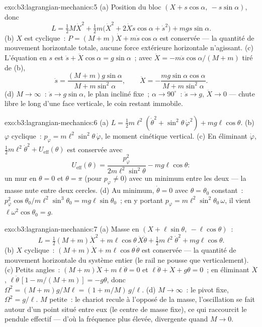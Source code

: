 \begin{solution}{exo:b3:lagrangian-mechanics:5}
(a) Position du bloc $(X + s\cos\alpha,\ -s\sin\alpha)$, donc
\[
L = \tfrac12 M\dot X^2 + \tfrac12 m\big(\dot X^2 +
2\dot X\dot s\cos\alpha + \dot s^2\big) + mgs\sin\alpha .
\]
(b) $X$ est cyclique~: $P = (M + m)\dot X + m\dot s\cos\alpha$ est
conservée --- la quantité de mouvement horizontale totale, aucune force
extérieure horizontale n'agissant. (c) L'équation en $s$ est $\ddot s + \ddot
X\cos\alpha = g\sin\alpha$~; avec $\ddot X = -m\ddot s\cos\alpha/(M +
m)$ tiré de (b),
\[
\ddot s = \frac{(M + m)g\sin\alpha}{M + m\sin^2\alpha} , \qquad
\ddot X = -\frac{mg\sin\alpha\cos\alpha}{M + m\sin^2\alpha} .
\]
(d) $M \to \infty$~: $\ddot s \to g\sin\alpha$, le plan incliné fixe~;
$\alpha \to 90^\circ$~: $\ddot s \to g$, $\ddot X \to 0$ --- chute libre
le long d'une face verticale, le coin restant immobile.
\end{solution}

\begin{solution}{exo:b3:lagrangian-mechanics:6}
(a) $L = \tfrac12 m\ell^2(\dot\theta^2 + \sin^2\theta\,\dot\varphi^2) +
mg\ell\cos\theta$. (b) $\varphi$ cyclique~: $p_\varphi =
m\ell^2\sin^2\theta\,\dot\varphi$, le moment cinétique vertical. (c)
En éliminant $\dot\varphi$, $\tfrac12 m\ell^2\dot\theta^2 +
U_{\text{eff}}(\theta)$ est conservée avec
\[
U_{\text{eff}}(\theta) = \frac{p_\varphi^2}{2m\ell^2\sin^2\theta}
 - mg\ell\cos\theta :
\]
un mur en $\theta = 0$ et $\theta = \pi$ (pour $p_\varphi \neq 0$) avec
un minimum entre les deux --- la masse nute entre deux cercles. (d) Au
minimum, $\dot\theta = 0$ avec $\theta = \theta_0$ constant~:
$p_\varphi^2\cos\theta_0/m\ell^2\sin^3\theta_0 = mg\ell\sin\theta_0$~;
en y portant $p_\varphi = m\ell^2\sin^2\theta_0\,\omega$, il vient
$\ell\omega^2\cos\theta_0 = g$.
\end{solution}

\begin{solution}{exo:b3:lagrangian-mechanics:7}
(a) Masse en $(X + \ell\sin\theta,\ -\ell\cos\theta)$~:
\[
L = \tfrac12(M + m)\dot X^2 + m\ell\cos\theta\,\dot X\dot\theta
 + \tfrac12 m\ell^2\dot\theta^2 + mg\ell\cos\theta .
\]
(b) $X$ cyclique~: $(M + m)\dot X + m\ell\cos\theta\,\dot\theta$ est
conservée --- la quantité de mouvement horizontale du système entier
(le rail ne pousse que verticalement). (c) Petits angles~: $(M + m)\ddot X +
m\ell\ddot\theta = 0$ et $\ell\ddot\theta + \ddot X + g\theta = 0$~;
en éliminant $\ddot X$, $\ell\ddot\theta\,[1 - m/(M + m)] = -g\theta$,
donc $\Omega^2 = (M + m)g/M\ell = (1 + m/M)\,g/\ell$. (d) $M \to \infty$~:
le pivot fixe, $\Omega^2 = g/\ell$. $M$ petite~: le chariot recule à
l'opposé de la masse, l'oscillation se fait autour d'un point situé
entre eux (le centre de masse fixe), ce qui raccourcit le pendule
effectif --- d'où la fréquence plus élevée, divergente quand $M \to 0$.
\end{solution}

